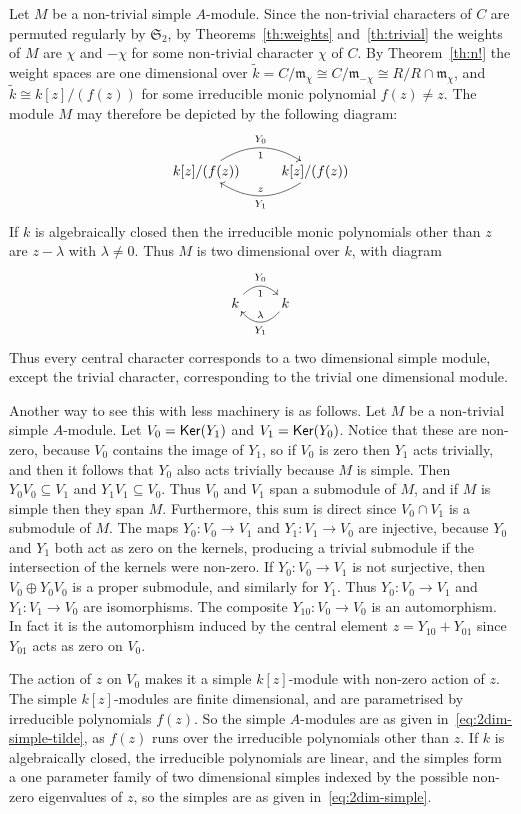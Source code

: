 \documentclass[12pt]{amsart}
\newcommand{\Ker}{\operatorname{\sf Ker}}
\newcommand{\sym}[1]{\mathfrak{S}_{#1}}
\newcommand{\mfm}{\mathfrak{m}}
\numberwithin{equation}{section}
\theoremstyle{definition}
\begin{document}
Let $M$ be a non-trivial simple $A$-module. Since the non-trivial
characters of $C$ are permuted regularly by $\sym{2}$, by
Theorems~\ref{th:weights} and~\ref{th:trivial} the weights of $M$ are
$\chi$ and $-\chi$ for some non-trivial character $\chi$ of $C$. By
Theorem~\ref{th:n!} the weight spaces are one dimensional over 
$\tilde k=C/\mfm_\chi\cong C/\mfm_{-\chi}\cong
R/R\cap\mfm_\chi$, and $\tilde k\cong k[z]/(f(z))$ for some irreducible monic polynomial
$f(z)\ne z$. The module $M$ may therefore be depicted by the following
diagram:
\begin{equation}\label{eq:2dim-simple-tilde}
\xymatrix{k[z]/(f(z)) \ar@/^{4ex}/[r]^{Y_0}_1 &
    k[z]/(f(z))\ar@/^{4ex}/[l]^{Y_1}_z} 
\end{equation}
If $k$ is algebraically closed then the irreducible monic polynomials
other than $z$ are $z-\lambda$ with $\lambda\ne 0$. Thus $M$ is two
dimensional over $k$, with diagram
\begin{equation}\label{eq:2dim-simple}
\xymatrix{k \ar@/^{3ex}/[r]^{Y_0}_1 &
    k\ar@/^{3ex}/[l]^{Y_1}_\lambda} 
\end{equation}
Thus every central character corresponds to a two dimensional simple
module, except the trivial character, corresponding to the trivial one
dimensional module.

Another way to see this with less machinery is as follows.
Let $M$ be a non-trivial simple $A$-module.
Let $V_0=\Ker(Y_1)$ and $V_1=\Ker(Y_0)$. Notice that these are
non-zero, because $V_0$ contains the image of $Y_1$, so if $V_0$ is
zero then $Y_1$ acts trivially, and then it follows that $Y_0$ also
acts trivially because $M$ is simple. Then $Y_0V_0\subseteq V_1$ and
$Y_1V_1\subseteq V_0$. Thus $V_0$ and $V_1$ span a submodule of $M$,
and if $M$ is simple then they span $M$. Furthermore, this sum is
direct since $V_0\cap V_1$ is a submodule of $M$.
The maps $Y_0\colon V_0\to V_1$ and
$Y_1\colon V_1\to V_0$ are injective, because $Y_0$ and $Y_1$ both
act as zero on the kernels, producing a trivial submodule if the
intersection of the
kernels were non-zero. If $Y_0\colon V_0\to V_1$ is not
surjective, then $V_0\oplus Y_0V_0$ is a proper submodule, and
similarly for $Y_1$. Thus $Y_0\colon V_0\to V_1$ and $Y_1\colon V_1\to
V_0$ are isomorphisms. The
composite $Y_{10}\colon V_0\to V_0$ is an automorphism. In fact it is
the automorphism induced by the central element $z=Y_{10}+Y_{01}$ since $Y_{01}$ acts as zero on $V_0$.

The  action of $z$ on $V_0$ makes it a simple
$k[z]$-module with non-zero action of $z$. The simple $k[z]$-modules are finite
dimensional, and are
parametrised by irreducible polynomials $f(z)$. 
So the simple $A$-modules are as given
in~\eqref{eq:2dim-simple-tilde}, as $f(z)$ runs over the irreducible
polynomials other than $z$.
If $k$ is
algebraically closed, the irreducible polynomials are linear, and the
simples form a one parameter family of two dimensional simples indexed
by the possible non-zero eigenvalues of $z$, so the simples are as
given in~\eqref{eq:2dim-simple}.\bigskip
\end{document}
